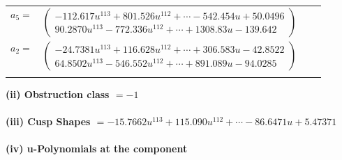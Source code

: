 \documentclass[1p]{elsarticle_modified}
\theoremstyle{definition}
\begin{document}
\begin{tabular}{m{7pt} m{180pt} m{7pt} m{180pt} }
\flushright $a_{5}=$&$\begin{pmatrix}-112.617 u^{113}+801.526 u^{112}+\cdots-542.454 u+50.0496\\90.2870 u^{113}-772.336 u^{112}+\cdots+1308.83 u-139.642\end{pmatrix}$ \\
\flushright $a_{2}=$&$\begin{pmatrix}-24.7381 u^{113}+116.628 u^{112}+\cdots+306.583 u-42.8522\\64.8502 u^{113}-546.552 u^{112}+\cdots+891.089 u-94.0285\end{pmatrix}$\\&\end{tabular}
\flushleft \textbf{(ii) Obstruction class $= -1$}\\~\\
\flushleft \textbf{(iii) Cusp Shapes $= -15.7662 u^{113}+115.090 u^{112}+\cdots-86.6471 u+5.47371$}\\~\\
\newpage\renewcommand{\arraystretch}{1}
\flushleft \textbf{(iv) u-Polynomials at the component}\newline \\
\end{document}
